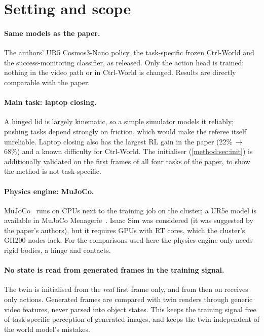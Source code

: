 \section{Setting and scope}\label{method:sec:scope}

\paragraph{Same models as the paper.} The authors' UR5 Cosmos3-Nano policy, the task-specific frozen Ctrl-World and the success-monitoring classifier, as released. Only the action head is trained; nothing in the video path or in Ctrl-World is changed. Results are directly comparable with the paper.

\paragraph{Main task: laptop closing.} A hinged lid is largely kinematic, so a simple simulator models it reliably; pushing tasks depend strongly on friction, which would make the referee itself unreliable. Laptop closing also has the largest RL gain in the paper (22\%$\,\to\,$68\%) and a known difficulty for Ctrl-World. The initialiser (\ref{method:sec:init}) is additionally validated on the first frames of all four tasks of the paper, to show the method is not task-specific.

\paragraph{Physics engine: MuJoCo.} MuJoCo~\cite{mujoco} runs on CPUs next to the training job on the cluster; a UR5e model is available in MuJoCo Menagerie~\cite{menagerie}. Isaac Sim was considered (it was suggested by the paper's authors), but it requires GPUs with RT cores, which the cluster's GH200 nodes lack. For the comparisons used here the physics engine only needs rigid bodies, a hinge and contacts.

\paragraph{No state is read from generated frames in the training signal.} The twin is initialised from the \emph{real} first frame only, and from then on receives only actions. Generated frames are compared with twin renders through generic video features, never parsed into object states. This keeps the training signal free of task-specific perception of generated images, and keeps the twin independent of the world model's mistakes.

